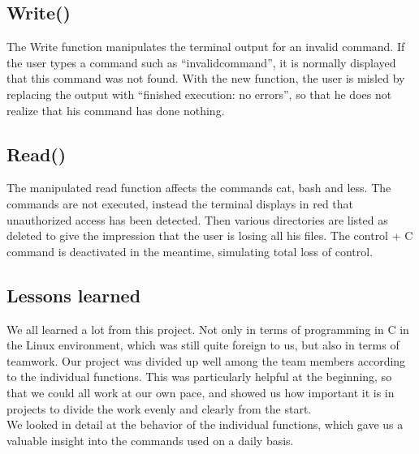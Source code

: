 \subsection{Write()}
The Write function manipulates the terminal output for an invalid command. 
If the user types a command such as “invalidcommand”, it is normally displayed that this command was not found. 
With the new function, the user is misled by replacing the output with “finished execution: no errors”, so that he does not realize that his command has done nothing.

\subsection{Read()}
The manipulated read function affects the commands cat, bash and less. 
The commands are not executed, instead the terminal displays in red that unauthorized access has been detected. 
Then various directories are listed as deleted to give the impression that the user is losing all his files. 
The control + C command is deactivated in the meantime, simulating total loss of control.

\subsection{Lessons learned}
We all learned a lot from this project.
 Not only in terms of programming in C in the Linux environment, which was still quite foreign to us, but also in terms of teamwork. 
 Our project was divided up well among the team members according to the individual functions. This was particularly helpful at the beginning, so that we could all work at our own pace, and showed us how important it is in projects to divide the work evenly and clearly from the start. \\
 We looked in detail at the behavior of the individual functions, which gave us a valuable insight into the commands used on a daily basis.